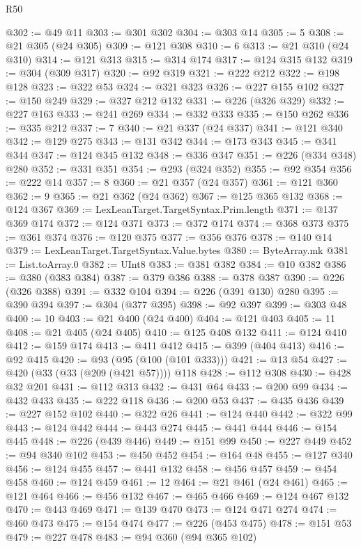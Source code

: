 \begin{lexlean}{R50}
\begin{coremodule}
{{{{{{{{{{{{{{{{{{{{{{{{{{{{{{{{{{{{{{{{{{{{{{{{{{{{{{{{{{{{@302 := @49 @11
@303 := @301 @302
@304 := @303 @14
@305 := 5
@308 := @21 @305 (@24 @305)
@309 := @121 @308
@310 := 6
@313 := @21 @310 (@24 @310)
@314 := @121 @313
@315 := @314 @174
@317 := @124 @315 @132
@319 := @304 (@309 @317)
@320 := @92 @319
@321 := @222 @212
@322 := @198 @128
@323 := @322 @53
@324 := @321 @323
@326 := @227 @155 @102
@327 := @150 @249
@329 := @327 @212 @132
@331 := @226 (@326 @329)
@332 := @227 @163
@333 := @241 @269
@334 := @332 @333
@335 := @150 @262
@336 := @335 @212
@337 := 7
@340 := @21 @337 (@24 @337)
@341 := @121 @340
@342 := @129 @275
@343 := @131 @342
@344 := @173 @343
@345 := @341 @344
@347 := @124 @345 @132
@348 := @336 @347
@351 := @226 (@334 @348) @280
@352 := @331 @351
@354 := @293 (@324 @352)
@355 := @92 @354
@356 := @222 @14
@357 := 8
@360 := @21 @357 (@24 @357)
@361 := @121 @360
@362 := 9
@365 := @21 @362 (@24 @362)
@367 := @125 @365 @132
@368 := @124 @367
@369 := LexLeanTarget.TargetSyntax.Prim.length
@371 := @137 @369 @174
@372 := @124 @371
@373 := @372 @174
@374 := @368 @373
@375 := @361 @374
@376 := @120 @375
@377 := @356 @376
@378 := @140 @14
@379 := LexLeanTarget.TargetSyntax.Value.bytes
@380 := ByteArray.mk
@381 := List.toArray.{0}
@382 := UInt8
@383 := @381 @382
@384 := @10 @382
@386 := @380 (@383 @384)
@387 := @379 @386
@388 := @378 @387
@390 := @226 (@326 @388)
@391 := @332 @104
@394 := @226 (@391 @130) @280
@395 := @390 @394
@397 := @304 (@377 @395)
@398 := @92 @397
@399 := @303 @48
@400 := 10
@403 := @21 @400 (@24 @400)
@404 := @121 @403
@405 := 11
@408 := @21 @405 (@24 @405)
@410 := @125 @408 @132
@411 := @124 @410
@412 := @159 @174
@413 := @411 @412
@415 := @399 (@404 @413)
@416 := @92 @415
@420 := @93 (@95 (@100 (@101 @333)))
@421 := @13 @54
@427 := @420 (@33 (@33 (@209 (@421 @57)))) @118
@428 := @112 @308
@430 := @428 @32 @201
@431 := @112 @313
@432 := @431 @64
@433 := @200 @99
@434 := @432 @433
@435 := @222 @118
@436 := @200 @53
@437 := @435 @436
@439 := @227 @152 @102
@440 := @322 @26
@441 := @124 @440
@442 := @322 @99
@443 := @124 @442
@444 := @443 @274
@445 := @441 @444
@446 := @154 @445
@448 := @226 (@439 @446)
@449 := @151 @99
@450 := @227 @449
@452 := @94 @340 @102
@453 := @450 @452
@454 := @164 @48
@455 := @127 @340
@456 := @124 @455
@457 := @441 @132
@458 := @456 @457
@459 := @454 @458
@460 := @124 @459
@461 := 12
@464 := @21 @461 (@24 @461)
@465 := @121 @464
@466 := @456 @132
@467 := @465 @466
@469 := @124 @467 @132
@470 := @443 @469
@471 := @139 @470
@473 := @124 @471 @274
@474 := @460 @473
@475 := @154 @474
@477 := @226 (@453 @475)
@478 := @151 @53
@479 := @227 @478
@483 := @94 @360 (@94 @365 @102)
}}}}}}}}}}}}}}}}}}}}}}}}}}}}}}}}}}}}}}}}}}}}}}}}}}}}}}}}}}}}
\end{coremodule}
\end{lexlean}
